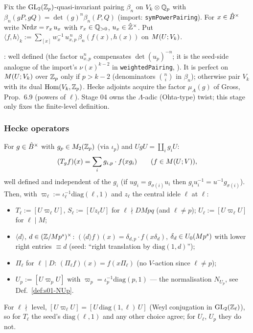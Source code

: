 \begin{definition}\label{def:s01-pairingV}
Fix the $\mathrm{GL}_2(\mathbb{Z}_p)$-quasi-invariant pairing $\beta_n$ on $V_k\otimes\mathbb{Q}_p$ with $\beta_n(gP,gQ)=\det(g)^n\beta_n(P,Q)$
(import: \texttt{symPowerPairing}). For $x\in\hat{B}^\times$ write $\mathrm{Nrd} x=r_x\,u_x$ with $r_x\in\mathbb{Q}_{>0}$, $u_x\in\hat{\mathbb{Z}}^\times$. Put
$\langle f,h\rangle_k:=\sum_{[x]}w_x^{-1}\,u_{x,p}^{\,n}\,\beta_n(f(x),h(x))$ on $M(U;V_k)$.
\end{definition}
\noindent\sttoprove: well defined (the factor $u_{x,p}^n$ compensates $\det(u_p)^{-n}$; it is the seed-side analogue of the import's
$\nu(x)^{k-2}$ in \texttt{weightedPairing}, ). It is perfect on $M(U;V_k)$ over $\mathbb{Z}_p$ only if
$p>k-2$ (denominators $\binom{n}{i}$ in $\beta_n$); otherwise pair $V_k$ with its dual $\operatorname{Hom}(V_k,\mathbb{Z}_p)$. Hecke adjoints acquire
the factor $\mu_A(g)$ of Gross, Prop.~6.9 (powers of $\ell$). Stage 04 owns the $\Lambda$-adic (Ohta-type) twist; this
stage only fixes the finite-level definition.

\subsubsection{Hecke operators}

\begin{definition}\label{def:s01-hecke}
For $g\in\hat{B}^\times$ with $g_p\in M_2(\mathbb{Z}_p)$ (via $\iota_p$) and $UgU=\coprod_ig_iU$:
\[(T_gf)(x)=\sum_ig_{i,p}\cdot f(xg_i)\qquad(f\in M(U;V)),\]
well defined and independent of the $g_i$ \stproved{} (if $ug_i=g_{\sigma(i)}u_i$ then $g_iu_i^{-1}=u^{-1}g_{\sigma(i)}$). Then,
with $\varpi_\ell:=\iota_\ell^{-1}\mathrm{diag}(\ell,1)$ and $z_\ell$ the central idele $\ell$ at $\ell$:
\begin{itemize}
\item $T_\ell:=[U\varpi_\ell U]$, $S_\ell:=[Uz_\ell U]$ for $\ell\nmid DMpq$ (and $\ell\ne p$); $U_\ell:=[U\varpi_\ell U]$ for $\ell\mid M$;
\item $\langle d\rangle$, $d\in(\mathbb{Z}/Mp^s)^\times$: $(\langle d\rangle f)(x)=\delta_{d,p}\cdot f(x\delta_d)$, $\delta_d\in U_0(Mp^s)$ with lower
  right entries $\equiv d$ (seed: ``right translation by $\mathrm{diag}(1,d)$'');
\item $\Pi_\ell$ for $\ell\mid D$: $(\Pi_\ell f)(x)=f(x\Pi_\ell)$ (no $V$-action since $\ell\ne p$);
\item $U_p:=[U\varpi_pU]$ with $\varpi_p=\iota_p^{-1}\mathrm{diag}(p,1)$ --- the normalisation $N_{U_p}$, see
  Def.~\ref{def:s01-NUp}.
\end{itemize}
For $\ell\nmid$ level, $[U\varpi_\ell U]=[U\,\mathrm{diag}(1,\ell)\,U]$ (Weyl conjugation in $\mathrm{GL}_2(\mathbb{Z}_\ell)$), so for $T_\ell$ the
seed's $\mathrm{diag}(\ell,1)$ and any other choice agree; for $U_\ell$, $U_p$ they do not.
\end{definition}

